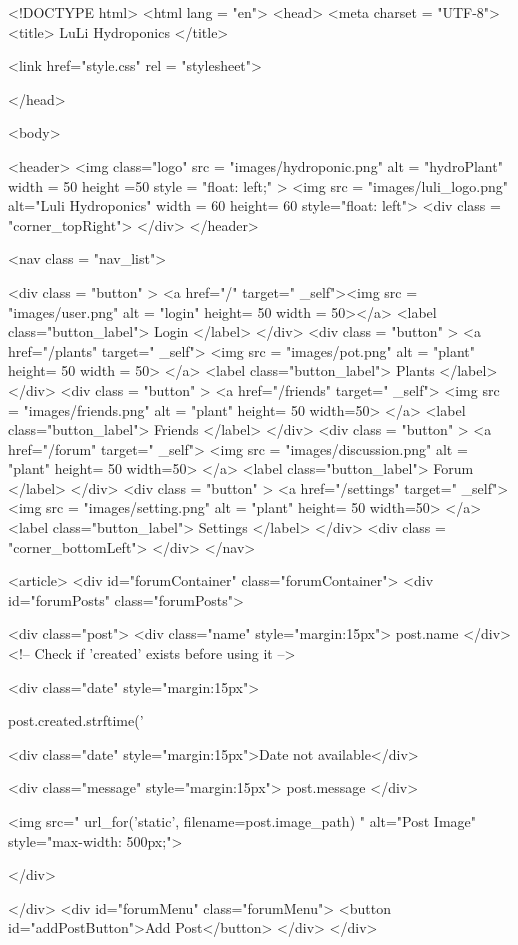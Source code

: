 \documentclass[12pt]{article} %
\begin{document}
\begin{htmlcode}[caption={Forum HTML}]
<!DOCTYPE html>
<html lang = "en">
<head>
<meta charset = "UTF-8">
<title> LuLi Hydroponics </title>

<link href="style.css" 
      rel = "stylesheet">


</head>

<body>
 
   <header>
      <img class="logo" src = "images/hydroponic.png" alt = "hydroPlant"  width = 50 height =50 style = "float: left;" >   
      <img src = "images/luli_logo.png" alt="Luli Hydroponics" width = 60 height= 60 style="float: left">
      <div class = "corner_topRight"> </div>
   </header>

   <nav class = "nav_list">
      
      <div class = "button" > 
         <a href="/" target=" _self"><img src = "images/user.png" alt = "login" height= 50 width = 50></a>
         <label class="button_label"> Login </label> 
      </div>
      <div class = "button" > 
         <a href="/plants" target=" _self"> <img src = "images/pot.png" alt = "plant" height= 50 width = 50> </a>
         <label class="button_label"> Plants </label> 
      </div>
      <div class = "button" > 
         <a href="/friends" target=" _self"> <img src = "images/friends.png" alt = "plant" height= 50 width=50> </a>
         <label class="button_label"> Friends </label> 
      </div>
      <div class = "button" > 
         <a href="/forum" target=" _self"> <img src = "images/discussion.png" alt = "plant" height= 50 width=50> </a>
         <label class="button_label"> Forum </label> 
      </div>
      <div class = "button" > 
         <a href="/settings" target=" _self"> <img src = "images/setting.png" alt = "plant" height= 50 width=50> </a>
         <label class="button_label"> Settings </label> 
      </div>
         <div class = "corner_bottomLeft"> </div>
     </nav>
     
     <article>
      <div id="forumContainer" class="forumContainer">
         <div id="forumPosts" class="forumPosts"> 
            {%
               <div class="post">
                  <div class="name" style="margin:15px">{{ post.name }}</div>
                  <!-- Check if 'created' exists before using it -->
                  {%
                     <div class="date" style="margin:15px">{{ post.created.strftime('%
                  {%
                     <div class="date" style="margin:15px">Date not available</div>
                  {%
                  <div class="message" style="margin:15px">{{ post.message }}</div>
                  {%
                     <img src="{{ url_for('static', filename=post.image_path) }}" alt="Post Image" style="max-width: 500px;">
                  {%
               </div>
               {%
         </div>
         <div id="forumMenu" class="forumMenu">
            <button id="addPostButton">Add Post</button>
         </div>
      </div>
    
}}}}}}}}}
\end{htmlcode}
\end{document}
